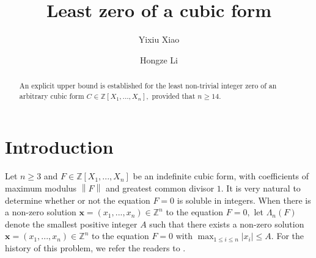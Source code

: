 \documentclass[12pt]{amsart}
\theoremstyle{definition}
\numberwithin{equation}{section}
\begin{document}

\baselineskip=17pt


\title[Sample paper]{Least zero of a cubic form}

\author[Y. X. Xiao]{Yixiu Xiao}
\address{School of Mathematical Sciences\\ Shanghai Jiao Tong University\\
800 Dongchuan RD\\
200240 Shanghai, China}

\author[H. Z. Li]{Hongze Li}
\address{School of Mathematical Sciences\\ Shanghai Jiao Tong University\\
800 Dongchuan RD\\
200240 Shanghai, China}


\date{}


\begin{abstract}
An explicit upper bound is established for the least non-trivial integer zero of an arbitrary cubic form $C \in \mathbb{Z}[X_1,...,X_n],$ provided that $n \geq 14.$
\end{abstract}



\maketitle



\section{Introduction}
Let $n \geq 3$ and $F \in \mathbb{Z}[X_1,...,X_n]$ be an indefinite cubic form, with coefficients of maximum modulus $\left\| F\right\|$ and greatest common divisor $1$. It is very natural to determine whether or not the equation $F = 0$ is soluble in integers. When there
is a non-zero solution $\boldsymbol{x} = (x_1,...,x_n) \in \mathbb{Z}^n$ to the equation $F = 0,$ let $\Lambda_n (F)$ denote the smallest positive integer $A$ such that there exists a non-zero solution
$\boldsymbol{x} = (x_1,...,x_n) \in \mathbb{Z}^n$ to the equation $F = 0$ with $\max_{1 \leq i \leq n}|x_i| \leq A.$ For the
history of this problem, we refer the readers to \cite{browning2009least}.
\end{document}
